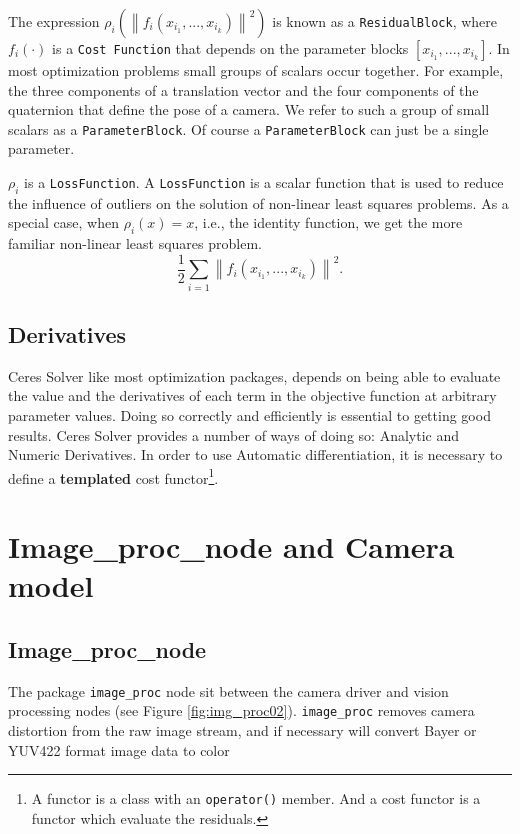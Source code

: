 The expression $\rho_i\left(\left\|f_i\left(x_{i_1},...,x_{i_k}\right)\right\|^2\right)$ is known as a \texttt{ResidualBlock}, where $f_i(\cdot)$ is a \texttt{Cost Function} that depends on the parameter blocks $\left[x_{i_1},... , x_{i_k}\right]$. In most optimization problems small groups of scalars occur together. For example, the three components of a translation vector and the four components of the quaternion that define the pose of a camera. We refer to such a group of small scalars as a \texttt{ParameterBlock}. Of course a \texttt{ParameterBlock} can just be a single parameter.

$\rho_i$ is a \texttt{LossFunction}. A \texttt{LossFunction} is a scalar function that is used to reduce the influence of outliers on the solution of non-linear least squares problems. As a special case, when $\rho_i(x) = x$, i.e., the identity function, we get the more familiar non-linear least squares problem.
\[
 \frac{1}{2}\sum_{i=1} \left\|f_i\left(x_{i_1}, ... ,x_{i_k}\right)\right\|^2.
\]

\subsection*{Derivatives}
Ceres Solver like most optimization packages, depends on being able to evaluate the value and the derivatives of each term in the objective function at arbitrary parameter values. Doing so correctly and efficiently is essential to getting good results. Ceres Solver provides a number of ways of doing so: Analytic and Numeric Derivatives. In order to use Automatic differentiation, it is necessary to define a \textbf{templated} cost functor\footnote{A functor is a class with an \texttt{operator()} member. And a cost functor is a functor which evaluate the residuals.}.



\section{Image\_proc\_node and Camera model}

\subsection{Image\_proc\_node}

The package \texttt{image\_proc} node sit between the camera driver and vision processing nodes (see Figure \ref{fig:img_proc02}). \texttt{image\_proc} removes camera distortion from the raw image stream, and if necessary will convert Bayer or YUV422 format image data to color

